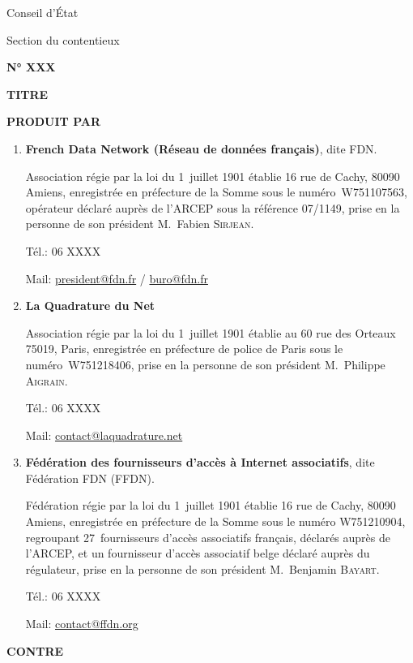 \begin{titlepage}
\begin{minipage}{5cm}\centering
Conseil d'État\par
Section du contentieux\par
\textbf{N° XXX}
\end{minipage}

\vskip 1cm

\begin{center}\LARGE\bfseries
  TITRE
\end{center}

\vskip 1cm

\textbf{PRODUIT PAR}

\begin{enumerate}
\item \textbf{French Data Network (Réseau de données français)}, dite FDN.

Association    régie par la loi du 1\ier~juillet  1901 établie 16 rue de Cachy,  80090   Amiens, enregistrée en préfecture  de la Somme sous le    numéro~W751107563, opérateur déclaré auprès de  l'ARCEP sous la    référence 07/1149, prise en la personne de son président  M.~Fabien    \textsc{Sirjean}.

Tél.: 06 XXXX

Mail: \url{president@fdn.fr} / \url{buro@fdn.fr}

\item \textbf{La Quadrature du Net}

Association    régie par la loi du 1\ier~juillet  1901 établie au 60 rue des Orteaux    75019, Paris, enregistrée en  préfecture de police de Paris sous le    numéro~W751218406, prise en la  personne de son président M.~Philippe    \textsc{Aigrain}.

Tél.: 06 XXXX

Mail:  \url{contact@laquadrature.net}

\item \textbf{Fédération des fournisseurs d'accès à Internet associatifs}, dite Fédération FDN (FFDN).

Fédération    régie par la loi du 1\ier~juillet  1901 établie 16 rue de Cachy,  80090   Amiens, enregistrée en préfecture  de la Somme sous le numéro  W751210904, regroupant 27~fournisseurs   d'accès associatifs français,   déclarés auprès de l'ARCEP, et un   fournisseur d'accès associatif  belge  déclaré auprès du régulateur,  prise  en la personne de son  président  M.~Benjamin \textsc{Bayart}.

Tél.: 06 XXXX

Mail: \url{contact@ffdn.org}
\end{enumerate}

\vskip 1cm

       
\noindent\textbf{CONTRE}

\vskip 1cm

\textbf{}


\end{titlepage}

